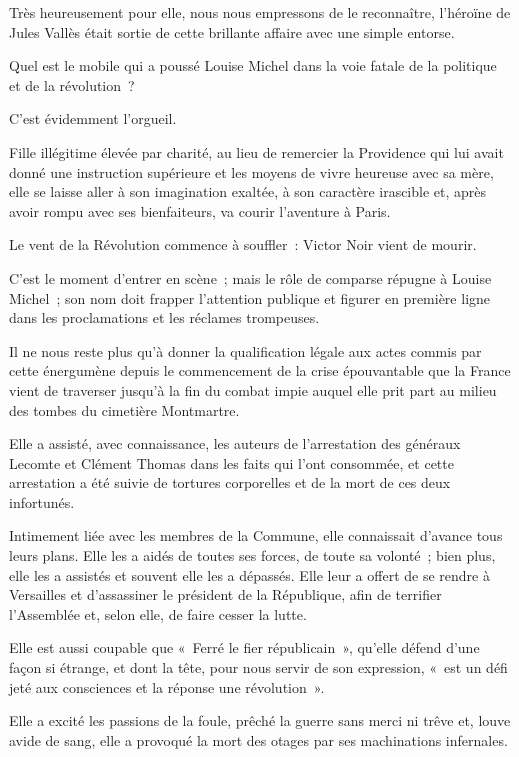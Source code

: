 \documentclass[french,twoside]{book} %
\begin{document}
\noindent Très heureusement pour elle, nous nous empressons de le reconnaître, l’héroïne de Jules Vallès était sortie de cette brillante affaire avec une simple entorse.\par
 Quel est le mobile qui a poussé Louise Michel dans la voie fatale de la politique et de la révolution ?\par
C’est évidemment l’orgueil.\par
Fille illégitime élevée par charité, au lieu de remercier la Providence qui lui avait donné une instruction supérieure et les moyens de vivre heureuse avec sa mère, elle se laisse aller à son imagination exaltée, à son caractère irascible et, après avoir rompu avec ses bienfaiteurs, va courir l’aventure à Paris.\par
Le vent de la Révolution commence à souffler : Victor Noir vient de mourir.\par
C’est le moment d’entrer en scène ; mais le rôle de comparse répugne à Louise Michel ; son nom doit frapper l’attention publique et figurer en première ligne dans les proclamations et les réclames trompeuses.\par
Il ne nous reste plus qu’à donner la qualification légale aux actes commis par cette énergumène depuis le commencement de la crise épouvantable que la France vient de traverser jusqu’à la fin du combat impie auquel elle prit part au milieu des tombes du cimetière Montmartre.\par
Elle a assisté, avec connaissance, les auteurs de l’arrestation des généraux Lecomte et Clément Thomas dans les faits qui l’ont consommée, et cette arrestation a été suivie de tortures corporelles et de la mort de ces deux infortunés.\par
Intimement liée avec les membres de la Commune, elle connaissait d’avance tous leurs plans. Elle les a aidés de toutes ses forces, de toute sa volonté ; bien plus, elle les a assistés et souvent elle les a dépassés. Elle leur a offert de se rendre à Versailles et d’assassiner le président de la République, afin de terrifier l’Assemblée et, selon elle, de faire cesser la lutte.\par
Elle est aussi coupable que « Ferré le fier républicain », qu’elle défend d’une façon si étrange, et dont la tête, pour nous servir de son expression, « est un défi jeté aux consciences et la réponse une révolution ».\par
Elle a excité les passions de la foule, prêché la guerre sans merci ni trêve et, louve avide de sang, elle a provoqué la mort des otages par ses machinations infernales.\par
\end{document}
